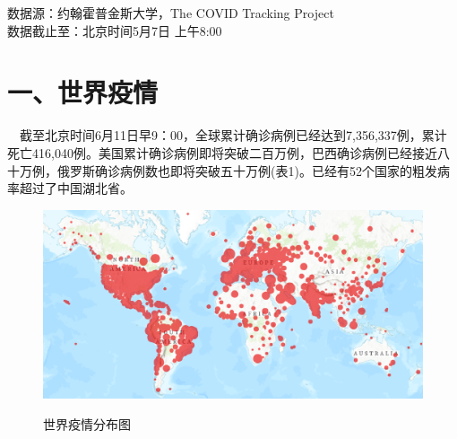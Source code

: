 \documentclass[
]{article}
\begin{document}
\vspace{5mm}

%
  \noindent{}%

\begin{Large}
{数据源：约翰霍普金斯大学，The COVID Tracking Project \\ 数据截止至：北京时间5月7日 上午8:00}
\end{Large}

\vspace{-7mm}

\hypertarget{section-2}{%
\section{\texorpdfstring{\textcolor{glaucous}{\Huge 一、世界疫情}}{}}\label{section-2}}

\vspace{-5mm}

\(\quad\)截至北京时间6月11日早9：00，全球累计确诊病例已经达到7,356,337例，累计死亡416,040例。美国累计确诊病例即将突破二百万例，巴西确诊病例已经接近八十万例，俄罗斯确诊病例数也即将突破五十万例(表1)。已经有52个国家的粗发病率超过了中国湖北省。

\begin{figure}[H]
\caption{世界疫情分布图} %
\centering
\includegraphics[]{./input/covid1.png} %
\label{} %
\end{figure}
\end{document}
